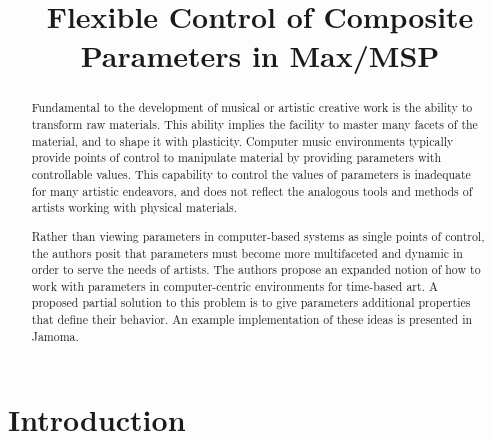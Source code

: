 \documentclass{article}
\title{Flexible Control of Composite Parameters in Max/MSP}
\begin{document}
\maketitle
\sloppy

\begin{abstract}


Fundamental to the development of musical or artistic creative work is the ability to transform raw materials. This ability implies the facility to master many facets of the material, and to shape it with plasticity. Computer music environments typically provide points of control to manipulate material by providing parameters with controllable values. This capability to control the values of parameters is inadequate for many artistic endeavors, and does not reflect the analogous tools and methods of artists working with physical materials.

Rather than viewing parameters in computer-based systems as single points of control, the authors posit that parameters must become more multifaceted and dynamic in order to serve the needs of artists. The authors propose an expanded notion of how to work with parameters in computer-centric environments for time-based art. A proposed partial solution to this problem is to give parameters additional properties that define their behavior. An example implementation of these ideas is presented in Jamoma. 

\end{abstract}


\section{Introduction} %
\label{sec:introduction}
\end{document}
